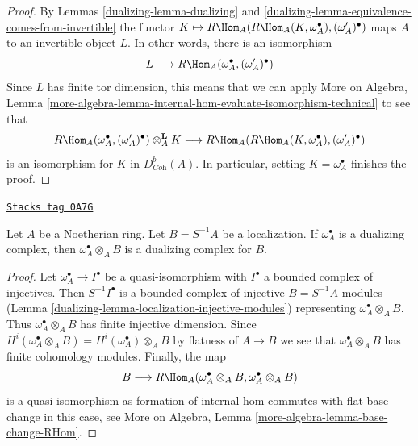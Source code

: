 \begin{proof}

By Lemmas \ref{dualizing-lemma-dualizing} and
\ref{dualizing-lemma-equivalence-comes-from-invertible} the functor
$K \mapsto R\Hom_A(R\Hom_A(K, \omega_A^\bullet), (\omega_A')^\bullet)$
maps $A$ to an invertible object $L$. In other words, there is
an isomorphism
$$
L \longrightarrow R\Hom_A(\omega_A^\bullet, (\omega_A')^\bullet)
$$
Since $L$ has finite tor dimension, this means that we can apply
More on Algebra, Lemma
\ref{more-algebra-lemma-internal-hom-evaluate-isomorphism-technical}
to see that
$$
R\Hom_A(\omega_A^\bullet, (\omega'_A)^\bullet) \otimes_A^\mathbf{L} K
\longrightarrow
R\Hom_A(R\Hom_A(K, \omega_A^\bullet), (\omega_A')^\bullet)
$$
is an isomorphism for $K$ in $D^b_{\textit{Coh}}(A)$.
In particular, setting $K = \omega_A^\bullet$ finishes the proof.
\end{proof}

\begin{lemma}
\label{dualizing-lemma-dualizing-localize}
\href{https://stacks.math.columbia.edu/tag/0A7G}{\texttt{Stacks tag 0A7G}}

Let $A$ be a Noetherian ring. Let $B = S^{-1}A$ be a localization.
If $\omega_A^\bullet$ is a dualizing
complex, then $\omega_A^\bullet \otimes_A B$ is a dualizing
complex for $B$.
\end{lemma}

\begin{proof}

Let $\omega_A^\bullet \to I^\bullet$ be a quasi-isomorphism
with $I^\bullet$ a bounded complex of injectives.
Then $S^{-1}I^\bullet$ is a bounded complex of injective
$B = S^{-1}A$-modules (Lemma \ref{dualizing-lemma-localization-injective-modules})
representing $\omega_A^\bullet \otimes_A B$.
Thus $\omega_A^\bullet \otimes_A B$ has finite injective dimension.
Since $H^i(\omega_A^\bullet \otimes_A B) = H^i(\omega_A^\bullet) \otimes_A B$
by flatness of $A \to B$ we see that $\omega_A^\bullet \otimes_A B$
has finite cohomology modules. Finally, the map
$$
B \longrightarrow
R\Hom_A(\omega_A^\bullet \otimes_A B, \omega_A^\bullet \otimes_A B)
$$
is a quasi-isomorphism as formation of internal hom commutes with
flat base change in this case, see
More on Algebra, Lemma \ref{more-algebra-lemma-base-change-RHom}.
\end{proof}


